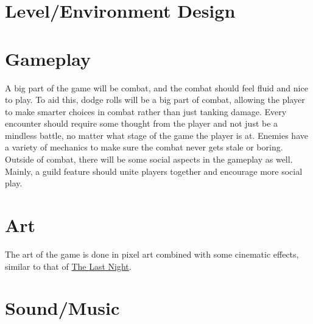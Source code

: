 \documentclass{article}
\begin{document}
\section{Level/Environment Design}

\section{Gameplay}
\hspace*{1cm}
A big part of the game will be combat, and the combat should feel fluid and nice to play. To aid this, dodge rolls will be a big part of combat, allowing the player to make smarter choices in combat rather than just tanking damage. Every encounter should require some thought from the player and not just be a mindless battle, no matter what stage of the game the player is at. Enemies have a variety of mechanics to make sure the combat never gets stale or boring. \\
\hspace*{1cm}
Outside of combat, there will be some social aspects in the gameplay as well. Mainly, a guild feature should unite players together and encourage more social play.

\section{Art}
\hspace*{1cm}
The art of the game is done in pixel art combined with some cinematic effects, similar to that of \href{http://store.steampowered.com/app/612400/The_Last_Night/}{The Last Night}. 

\section{Sound/Music}
\end{document}
